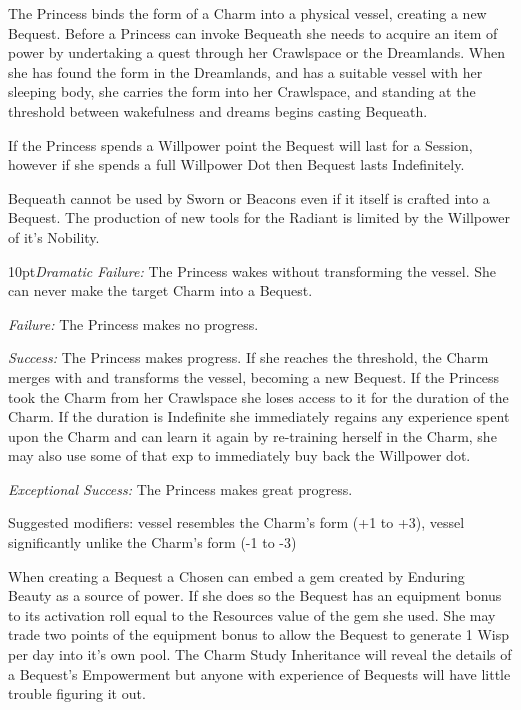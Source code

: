 \noindent The Princess binds the form of a Charm into a physical vessel, creating a new Bequest. Before a Princess can invoke Bequeath she needs to acquire an item of power by undertaking a quest through her Crawlspace or the Dreamlands. When she has found the form in the Dreamlands, and has a suitable vessel with her sleeping body, she carries the form into her Crawlspace, and standing at the threshold between wakefulness and dreams begins casting Bequeath.

If the Princess spends a Willpower point the Bequest will last for a Session, however if she spends a full Willpower Dot then Bequest lasts Indefinitely. 

Bequeath cannot be used by Sworn or Beacons even if it itself is crafted into a Bequest. The production of new tools for the Radiant is limited by the Willpower of it's Nobility. 

    \begin{myindentpar}{10pt}\emph{Dramatic Failure:} The Princess wakes without transforming the vessel. She can never make the target Charm into a Bequest.

    \emph{Failure:} The Princess makes no progress.

    \emph{Success:} The Princess makes progress. If she reaches the threshold, the Charm merges with and transforms the vessel, becoming a new Bequest. If the Princess took the Charm from her Crawlspace she loses access to it for the duration of the Charm. If the duration is Indefinite she immediately regains any experience spent upon the Charm and can learn it again by re-training herself in the Charm, she may also use some of that exp to immediately buy back the Willpower dot.

    \emph{Exceptional Success:} The Princess makes great progress.

Suggested modifiers: vessel resembles the Charm's form (+1 to +3), vessel significantly unlike the Charm's form (-1 to -3)\end{myindentpar} 

When creating a Bequest a Chosen can embed a gem created by Enduring Beauty as a source of power. If she does so the Bequest has an equipment bonus to its activation roll equal to the Resources value of the gem she used. She may trade two points of the equipment bonus to allow the Bequest to generate 1 Wisp per day into it's own pool. The Charm Study Inheritance will reveal the details of a Bequest's Empowerment but anyone with experience of Bequests will have little trouble figuring it out.

